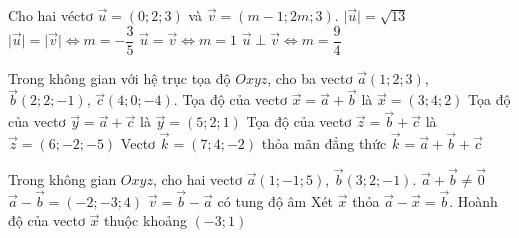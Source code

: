 \begin{ex}
	Cho hai véctơ $\vec{u}=(0;2;3)$ và $\vec{v}=(m-1;2m;3)$.
	\choiceTF
	{\True $\big|\vec{u}\big|=\sqrt{13}$}
	{$\big|\vec{u}\big|=\big|\vec{v}\big| \Leftrightarrow m=-\dfrac{3}{5}$}
	{\True $\vec{u}=\vec{v} \Leftrightarrow m=1$}
	{$\vec{u}\perp\vec{v} \Leftrightarrow m=\dfrac{9}{4}$}
\end{ex} 
\begin{ex}
	Trong không gian với hệ trục tọa độ $Oxyz$, cho ba vectơ $\vec{a}(1;2;3)$, $\vec{b}(2;2;-1)$, $\vec{c}(4;0;-4)$.
	\choiceTF
	{\True Tọa độ của vectơ $\vec{x}=\vec{a}+\vec{b}$ là $\vec{x}=(3;4;2)$}
	{Tọa độ của vectơ $\vec{y}=\vec{a}+\vec{c}$ là $\vec{y}=(5;2;1)$}
	{Tọa độ của vectơ $\vec{z}=\vec{b}+\vec{c}$ là $\vec{z}=(6;-2;-5)$}
	{\True Vectơ $\vec{k}=(7;4;-2)$ thỏa mãn đẳng thức $\vec{k}=\vec{a}+\vec{b}+\vec{c}$}
\end{ex}
\begin{ex}
	Trong không gian $Oxyz$, cho hai vectơ $\vec{a}(1;-1;5)$, $\vec{b}(3;2;-1)$.
	\choiceTF
	{\True $\vec{a}+\vec{b}\ne \vec{0}$}
	{$\vec{a}-\vec{b}=(-2;-3;4)$}
	{$\vec{v}=\vec{b}-\vec{a}$ có tung độ âm}
	{\True Xét $\vec{x}$ thỏa $\vec{a}-\vec{x}=\vec{b}$. Hoành độ của vectơ $\vec{x}$ thuộc khoảng $(-3;1)$}
\end{ex}
